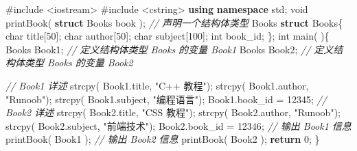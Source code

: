 \documentclass[
]{article}
\newenvironment{Shaded}{}{}
\newcommand{\CommentTok}[1]{\textcolor[rgb]{0.38,0.63,0.69}{\textit{#1}}}
\newcommand{\ControlFlowTok}[1]{\textcolor[rgb]{0.00,0.44,0.13}{\textbf{#1}}}
\newcommand{\DataTypeTok}[1]{\textcolor[rgb]{0.56,0.13,0.00}{#1}}
\newcommand{\DecValTok}[1]{\textcolor[rgb]{0.25,0.63,0.44}{#1}}
\newcommand{\ImportTok}[1]{#1}
\newcommand{\KeywordTok}[1]{\textcolor[rgb]{0.00,0.44,0.13}{\textbf{#1}}}
\newcommand{\NormalTok}[1]{#1}
\newcommand{\OperatorTok}[1]{\textcolor[rgb]{0.40,0.40,0.40}{#1}}
\newcommand{\PreprocessorTok}[1]{\textcolor[rgb]{0.74,0.48,0.00}{#1}}
\newcommand{\StringTok}[1]{\textcolor[rgb]{0.25,0.44,0.63}{#1}}
\begin{document}
\begin{Shaded}
\begin{Highlighting}[]
\PreprocessorTok{\#include }\ImportTok{\textless{}iostream\textgreater{}}
\PreprocessorTok{\#include }\ImportTok{\textless{}cstring\textgreater{}}
\KeywordTok{using} \KeywordTok{namespace}\NormalTok{ std}\OperatorTok{;}
\DataTypeTok{void}\NormalTok{ printBook}\OperatorTok{(} \KeywordTok{struct}\NormalTok{ Books book }\OperatorTok{);} 
\CommentTok{// 声明一个结构体类型 }
\NormalTok{Books }\KeywordTok{struct}\NormalTok{ Books}\OperatorTok{\{}
   \DataTypeTok{char}\NormalTok{  title}\OperatorTok{[}\DecValTok{50}\OperatorTok{];}   
   \DataTypeTok{char}\NormalTok{  author}\OperatorTok{[}\DecValTok{50}\OperatorTok{];}   
   \DataTypeTok{char}\NormalTok{  subject}\OperatorTok{[}\DecValTok{100}\OperatorTok{];}   
   \DataTypeTok{int}\NormalTok{   book\_id}\OperatorTok{;}
\OperatorTok{\};} 
\DataTypeTok{int}\NormalTok{ main}\OperatorTok{(} \OperatorTok{)\{}
\NormalTok{   Books Book1}\OperatorTok{;}        \CommentTok{// 定义结构体类型 Books 的变量 Book1}
\NormalTok{   Books Book2}\OperatorTok{;}        \CommentTok{// 定义结构体类型 Books 的变量 Book2}
 
    \CommentTok{// Book1 详述}
\NormalTok{   strcpy}\OperatorTok{(}\NormalTok{ Book1}\OperatorTok{.}\NormalTok{title}\OperatorTok{,} \StringTok{"C++ 教程"}\OperatorTok{);}   
\NormalTok{   strcpy}\OperatorTok{(}\NormalTok{ Book1}\OperatorTok{.}\NormalTok{author}\OperatorTok{,} \StringTok{"Runoob"}\OperatorTok{);} 
\NormalTok{   strcpy}\OperatorTok{(}\NormalTok{ Book1}\OperatorTok{.}\NormalTok{subject}\OperatorTok{,} \StringTok{"编程语言"}\OperatorTok{);}   
\NormalTok{   Book1}\OperatorTok{.}\NormalTok{book\_id }\OperatorTok{=} \DecValTok{12345}\OperatorTok{;} 
   \CommentTok{// Book2 详述}
\NormalTok{   strcpy}\OperatorTok{(}\NormalTok{ Book2}\OperatorTok{.}\NormalTok{title}\OperatorTok{,} \StringTok{"CSS 教程"}\OperatorTok{);}   
\NormalTok{   strcpy}\OperatorTok{(}\NormalTok{ Book2}\OperatorTok{.}\NormalTok{author}\OperatorTok{,} \StringTok{"Runoob"}\OperatorTok{);}   
\NormalTok{   strcpy}\OperatorTok{(}\NormalTok{ Book2}\OperatorTok{.}\NormalTok{subject}\OperatorTok{,} \StringTok{"前端技术"}\OperatorTok{);}   
\NormalTok{   Book2}\OperatorTok{.}\NormalTok{book\_id }\OperatorTok{=} \DecValTok{12346}\OperatorTok{;} 
   \CommentTok{// 输出 Book1 信息}
\NormalTok{   printBook}\OperatorTok{(}\NormalTok{ Book1 }\OperatorTok{);} 
   \CommentTok{// 输出 Book2 信息}
\NormalTok{   printBook}\OperatorTok{(}\NormalTok{ Book2 }\OperatorTok{);} 
   \ControlFlowTok{return} \DecValTok{0}\OperatorTok{;}
\OperatorTok{\}}


\end{Highlighting}
\end{Shaded}
\end{document}
